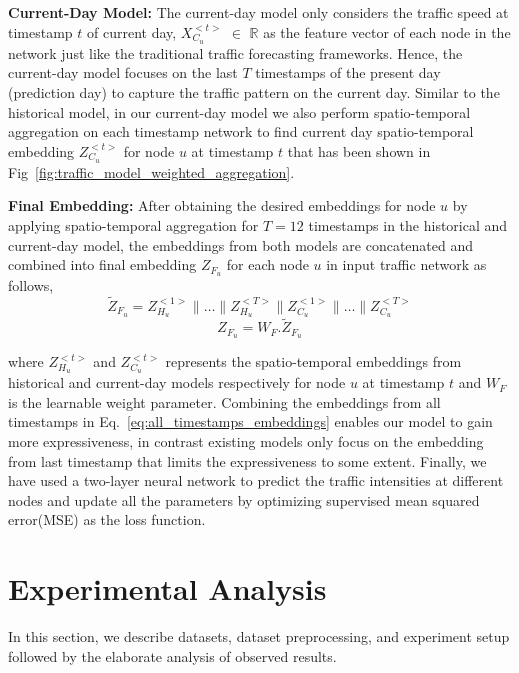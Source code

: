 \documentclass[runningheads]{llncs}
\begin{document}
\noindent
\textbf{Current-Day Model:} 
The current-day model only considers the traffic speed at timestamp $t$ of current day, $X^{<t>}_{C_{u}}$ $\in$ $\mathbb{R}$ as the feature vector of each node in the network just like the traditional traffic forecasting frameworks. Hence, the current-day model focuses on the last $T$ timestamps of the present day (prediction day) to capture the traffic pattern on the current day.  Similar to the historical model, in our current-day model we also perform spatio-temporal aggregation on each timestamp network to find current day spatio-temporal embedding $Z_{C_u}^{<t>}$  for node $u$  at timestamp $t$ that has been shown in Fig~\ref{fig:traffic_model_weighted_aggregation}.

\noindent
\textbf{Final Embedding:}
 After obtaining the desired embeddings for node $u$ by applying spatio-temporal aggregation for $ T = 12$ timestamps in the historical and current-day model, the embeddings from both models are concatenated and combined into final embedding  $Z_{F_u}$ for each node $u$ in input traffic network as follows,
\begin{equation}
    \widetilde{Z}_{F_{u}} = Z_{H_u}^{<1>}\parallel \ldots \parallel Z_{H_u}^{<T>} \parallel Z_{C_u}^{<1>} \parallel  \ldots \parallel Z_{C_u}^{<T>} 
    \label{eq:all_timestamps_embeddings}
    \end{equation}
    \begin{equation}
     {Z}_{F_{u}} = W_{F} . \widetilde{Z}_{F_{u}}
\end{equation}

where $Z_{H_u}^{<t>}$ and $Z_{C_u}^{<t>}$ represents the spatio-temporal embeddings from historical and current-day models respectively  for node $u$  at timestamp $t$ and $W_{F}$ is the learnable weight parameter. Combining the embeddings from all timestamps in Eq.~\ref{eq:all_timestamps_embeddings} enables our model to gain more expressiveness, in contrast existing models only focus on the embedding from last timestamp that limits the expressiveness to some extent. Finally, we have used a two-layer neural network to predict the traffic intensities at different nodes and update all the parameters by optimizing supervised mean squared error(MSE) as the loss function. 

\section{Experimental Analysis}
In this section, we describe datasets, dataset preprocessing, and experiment setup followed by the elaborate analysis of observed results.
\end{document}
